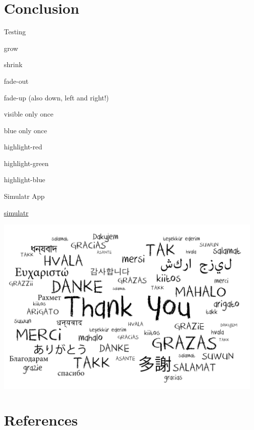 \documentclass[ignorenonframetext,]{beamer}
\newif\ifbibliography
\begin{document}
\begin{frame}

\end{frame}

\section{Conclusion}\label{conclusion}

\begin{frame}{Testing}

grow

shrink

fade-out

fade-up (also down, left and right!)

visible only once

blue only once

highlight-red

highlight-green

highlight-blue

\end{frame}

\begin{frame}{Simulatr App}

\href{http://nmbu.no}{simulatr}

\end{frame}

\begin{frame}

\begin{center}\includegraphics[width=0.9\linewidth]{images/ThankYou} \end{center}

\end{frame}

\section{References}\label{references}

\begin{frame}[allowframebreaks]{}
\bibliographytrue

\end{frame}
\end{document}

